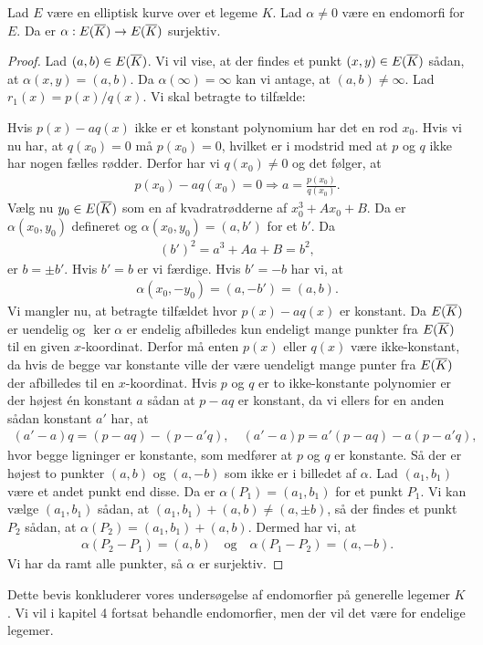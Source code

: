 \begin{thm}
\label{endomorfier:surjektiv}
Lad $E$ være en elliptisk kurve over et legeme $K$. Lad $\alpha \neq 0$ være en endomorfi for $E$. Da er $\alpha : E(\overline{K}) \to E(\overline{K})$ surjektiv.
\end{thm}
\begin{proof}
Lad $(a, b) \in E(\overline{K})$. Vi vil vise, at der findes et punkt $(x, y) \in E(\overline{K})$ sådan, at $\alpha(x, y) = (a, b)$. Da $\alpha(\infty) = \infty$ kan vi antage, at $(a,b) \neq \infty$. Lad $r_1(x) = p(x)/q(x)$. Vi skal betragte to tilfælde:

Hvis $p(x) - aq(x)$ ikke er et konstant polynomium har det en rod $x_0$. Hvis vi nu har, at $q(x_0)=0$ må $p(x_0) = 0$, hvilket er i modstrid med at $p$ og $q$ ikke har nogen fælles rødder. Derfor har vi $q(x_0) \neq 0$ og det følger, at 
\begin{align*}
	p(x_0) - aq(x_0) = 0 \Rightarrow a = \frac{p(x_0)}{q(x_0)}.
\end{align*}
Vælg nu $y_0 \in E(\overline{K})$ som en af kvadratrødderne af $x_{0}^{3} + Ax_0 + B$. Da er $\alpha(x_0, y_0)$ defineret og $\alpha(x_0, y_0) = (a, b')$ for et $b'$. Da 
\begin{align*}
	(b')^2 = a^3 + Aa + B = b^2,
\end{align*}
er $b=\pm b'$. Hvis $b'=b$ er vi færdige. Hvis $b'=-b$ har vi, at 
\begin{align*}
	\alpha(x_0, -y_0) = (a, -b') = (a, b).
\end{align*}
Vi mangler nu, at betragte tilfældet hvor $p(x)-aq(x)$ er konstant. Da $E(\overline{K})$ er uendelig og $\ker \alpha$ er endelig afbilledes kun endeligt mange punkter fra $E(\overline{K})$ til en given $x$-koordinat. Derfor må enten $p(x)$ eller $q(x)$ være ikke-konstant, da hvis de begge var konstante ville der være uendeligt mange punter fra $E(\overline{K})$ der afbilledes til en $x$-koordinat. Hvis $p$ og $q$ er to ikke-konstante polynomier er der højest én konstant $a$ sådan at $p-aq$ er konstant, da vi ellers for en anden sådan konstant $a'$ har, at
\begin{align*}
	(a' - a)q = (p - aq) - (p - a'q), \quad (a'-a)p=a'(p-aq)-a(p-a'q),
\end{align*}
hvor begge ligninger er konstante, som medfører at $p$ og $q$ er konstante. Så der er højest to punkter $(a,b)$ og $(a,-b)$ som ikke er i billedet af $\alpha$. Lad $(a_1, b_1)$ være et andet punkt end disse. Da er $\alpha(P_1)=(a_1, b_1)$ for et punkt $P_1$. Vi kan vælge $(a_1, b_1)$ sådan, at $(a_1, b_1) + (a, b) \neq (a, \pm b)$, så der findes et punkt $P_2$ sådan, at $\alpha(P_2)=(a_1, b_1) + (a,b)$. Dermed har vi, at 
\begin{align*}
	\alpha(P_2 - P_1) = (a, b) \quad \text{og} \quad \alpha(P_1 - P_2) = (a, -b).
\end{align*}
Vi har da ramt alle punkter, så $\alpha$ er surjektiv.
\end{proof}
Dette bevis konkluderer vores undersøgelse af endomorfier på generelle legemer $K$. Vi vil i kapitel 4 fortsat behandle endomorfier, men der vil det være for endelige legemer.
















